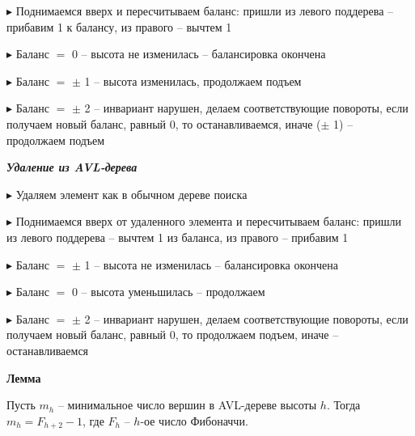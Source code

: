 $\blacktriangleright$ Поднимаемся вверх и пересчитываем баланс: пришли из
левого поддерева – прибавим 1 к балансу, из правого –
вычтем 1

$\blacktriangleright$ Баланс $=$ 0 – высота не изменилась – балансировка
окончена

$\blacktriangleright$ Баланс $=$ $\pm$ 1 – высота изменилась, продолжаем подъем

$\blacktriangleright$ Баланс $=$ $\pm$ 2 – инвариант нарушен, делаем
соответствующие повороты, если получаем новый баланс,
равный 0, то останавливаемся, иначе ($\pm$ 1) – продолжаем
подъем 


\textbf{\textit{Удаление из AVL-дерева}}

$\blacktriangleright$  Удаляем элемент как в обычном дереве поиска

$\blacktriangleright$  Поднимаемся вверх от удаленного элемента и
пересчитываем баланс: пришли из левого поддерева –
вычтем 1 из баланса, из правого – прибавим 1

$\blacktriangleright$  Баланс $=$ $\pm$ 1 – высота не изменилась – балансировка
окончена

$\blacktriangleright$  Баланс $=$ 0 – высота уменьшилась – продолжаем

$\blacktriangleright$  Баланс $=$ $\pm$ 2 – инвариант нарушен, делаем
соответствующие повороты, если получаем новый баланс,
равный 0, то продолжаем подъем, иначе -- останавливаемся


\textbf{Лемма}

Пусть $m_h$ -- минимальное число вершин в AVL-дереве высоты
$h$. 
Тогда $m_h = F_{h+2} - 1$, где $F_h$ -- $h$-ое число Фибоначчи.

\pagebreak

